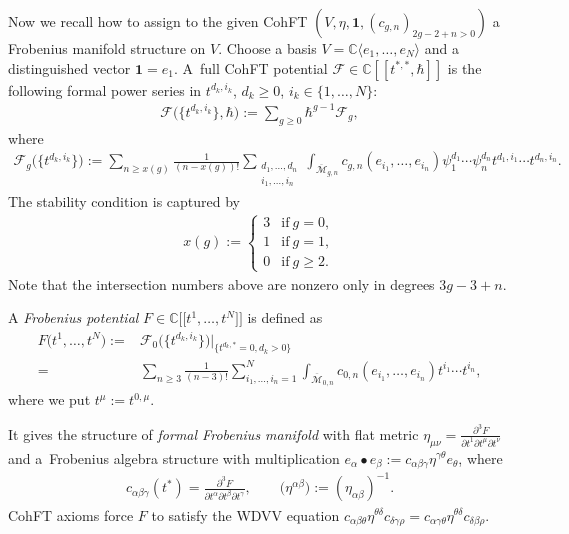 \documentclass[10pt,a4paper]{amsart}
\def\oM{\overline{\mathcal{M}}}
\numberwithin{equation}{section}
\begin{document}
Now we recall how to assign to the given CohFT $(V,\eta,\mathbf{1},(c_{g,n})_{2g-2+n>0})$ a Frobenius manifold structure on $V$. Choose a basis $V=\mathbb{C}\langle e_1,\dots, e_N\rangle$ and a distinguished vector $\mathbf{1} = e_1$.
A~full CohFT potential $\mathcal{F}\in \mathbb{C}[[t^{*,*},\hbar]]$ is the following formal power series in $t^{d_k,i_k}$, $d_k \geq 0$, $i_k \in \{1,\dots,N\}$:
\begin{align*}
 \mathcal{F}\big(\big\{t^{d_k,i_k}\big\},\hbar\big) := \sum_{g\geq0}\hbar^{g-1}\mathcal{F}_g,
\end{align*}
where
\begin{align*}
 \mathcal{F}_g\big(\big\{t^{d_k,i_k}\big\}\big) := \sum_{n\geq x(g)}\frac{1}{(n-x(g))!}\sum_{\substack{d_1,\dots,d_n \\ i_1,\dots,i_n}} \int_{\oM_{g,n}}c_{g,n}(e_{i_1},\dots,e_{i_n})\psi_1^{d_1}\cdots \psi_n^{d_n}t^{d_1,i_1}\cdots t^{d_n,i_n}.
\end{align*}
The stability condition is captured by{\samepage
\begin{align*}
x(g):=
\begin{cases}
3 & \text{if} \ g=0 ,\\
1 & \text{if} \ g=1 ,\\
0 & \text{if} \ g\geq 2 .
\end{cases}
\end{align*}
Note that the intersection numbers above are nonzero only in degrees $3g-3+n$.}


A \emph{Frobenius potential} $F \in \mathbb{C}\big[\big[t^1,\dots,t^N\big]\big]$ is defined as
\begin{align*}%
 F\big(t^1,\dots,t^N\big) :={}& \mathcal{F}_0\big(\big\{t^{d_k,i_k}\big\}\big)|_{\{t^{d_k,*}=0, d_k>0\}}\\
={}&
 \sum_{n\geq 3}\frac{1}{(n-3)!}\sum^N_{i_1,\dots,i_n=1} \int_{\oM_{0,n}}c_{0,n}(e_{i_1},\dots,e_{i_n}) t^{i_1}\cdots t^{i_n},
\end{align*}
where we put $t^{\mu}:=t^{0,\mu}$.

It gives the structure of \emph{formal Frobenius manifold} with flat metric
$
 \eta_{\mu\nu} = \frac{\partial^3 F}{\partial t^1\partial t^{\mu}\partial t^{\nu}}
$
and a~Frobenius algebra structure with multiplication $e_{\alpha} \bullet e_{\beta}:=c_{\alpha \beta \gamma}\eta^{\gamma \theta} e_{\theta}$, where
\begin{align*}
 c_{\alpha \beta \gamma}(t^*)= \frac{\partial^3 F}{\partial t^{\alpha}\partial t^{\beta}\partial t^{\gamma}}, \qquad \big(\eta^{\alpha\beta}\big):= (\eta_{\alpha\beta})^{-1}.
\end{align*}
CohFT axioms force $F$ to satisfy the WDVV equation
$
 c_{\alpha \beta \theta} \eta^{\theta\delta}
 c_{\delta \gamma \rho}=
 c_{\alpha \gamma \theta} \eta^{\theta\delta}
 c_{\delta \beta \rho}$.
\end{document}
